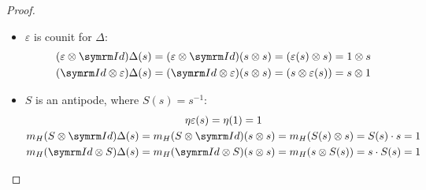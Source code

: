 \begin{proof}
\begin{itemize}
\begin{itemize}
        \item \(\varepsilon\) is counit for \(\Delta\):
        \begin{gather*}
            (\varepsilon \tensor \Id) \Delta (s) = (\varepsilon \tensor \Id) (s \tensor s) = (\varepsilon(s) \tensor s) = 1 \tensor s \\
            (\Id \tensor \varepsilon) \Delta (s) = (\Id \tensor \varepsilon) (s \tensor s) = (s \tensor \varepsilon(s)) = s \tensor 1
        \end{gather*}

        \item \(S\) is an antipode, where \(S(s) = s^{-1}\): \begin{gather*}
            \eta \varepsilon (s) = \eta (1) = 1 \\
            m_H (S \tensor \Id) \Delta (s) = m_H (S \tensor \Id) (s \tensor s) = m_H (S(s) \tensor s) = S(s) \cdot s = 1 \\
            m_H (\Id \tensor S) \Delta (s) = m_H (\Id \tensor S) (s \tensor s) = m_H (s \tensor S(s)) = s \cdot S(s) = 1
        \end{gather*}
    \end{itemize}
\end{itemize}
\end{proof}

